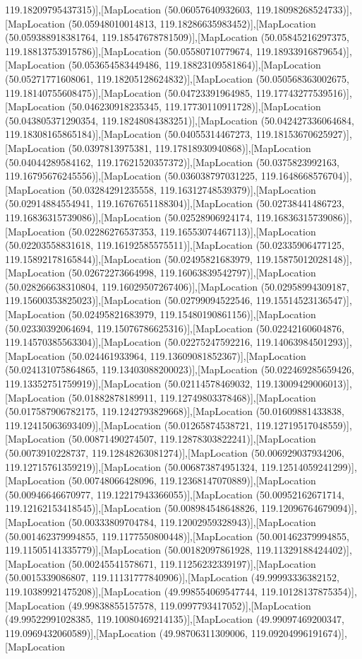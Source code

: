 119.18209795437315)],[MapLocation (50.06057640932603, 119.18098268524733)],[MapLocation (50.05948010014813, 119.18286635983452)],[MapLocation (50.059388918381764, 119.18547678781509)],[MapLocation (50.05845216297375, 119.18813753915786)],[MapLocation (50.05580710779674, 119.18933916879654)],[MapLocation (50.053654583449486, 119.18823109581864)],[MapLocation (50.05271771608061, 119.18205128624832)],[MapLocation (50.050568363002675, 119.18140755608475)],[MapLocation (50.04723391964985, 119.17743277539516)],[MapLocation (50.046230918235345, 119.17730110911728)],[MapLocation (50.043805371290354, 119.18248084383251)],[MapLocation (50.042427336064684, 119.18308165865184)],[MapLocation (50.04055314467273, 119.18153670625927)],[MapLocation (50.0397813975381, 119.17818930940868)],[MapLocation (50.04044289584162, 119.17621520357372)],[MapLocation (50.0375823992163, 119.16795676245556)],[MapLocation (50.036038797031225, 119.1648668576704)],[MapLocation (50.03284291235558, 119.16312748539379)],[MapLocation (50.02914884554941, 119.16767651188304)],[MapLocation (50.02738441486723, 119.16836315739086)],[MapLocation (50.02528906924174, 119.16836315739086)],[MapLocation (50.02286276537353, 119.16553074467113)],[MapLocation (50.02203558831618, 119.16192585575511)],[MapLocation (50.02335906477125, 119.15892178165844)],[MapLocation (50.02495821683979, 119.15875012028148)],[MapLocation (50.02672273664998, 119.16063839542797)],[MapLocation (50.028266638310804, 119.16029507267406)],[MapLocation (50.02958994309187, 119.15600353825023)],[MapLocation (50.02799094522546, 119.15514523136547)],[MapLocation (50.02495821683979, 119.15480190861156)],[MapLocation (50.02330392064694, 119.15076786625316)],[MapLocation (50.02242160604876, 119.14570385563304)],[MapLocation (50.02275247592216, 119.14063984501293)],[MapLocation (50.024461933964, 119.13609081852367)],[MapLocation (50.024131075864865, 119.13403088200023)],[MapLocation (50.022469285659426, 119.13352751759919)],[MapLocation (50.02114578469032, 119.13009429006013)],[MapLocation (50.01882878189911, 119.12749803378468)],[MapLocation (50.017587906782175, 119.1242793829668)],[MapLocation (50.01609881433838, 119.12415063693409)],[MapLocation (50.01265874538721, 119.12719517048559)],[MapLocation (50.00871490274507, 119.12878303822241)],[MapLocation (50.0073910228737, 119.12848263081274)],[MapLocation (50.006929037934206, 119.12715761359219)],[MapLocation (50.006873874951324, 119.12514059241299)],[MapLocation (50.00748066428096, 119.12368147070889)],[MapLocation (50.00946646670977, 119.12217943366055)],[MapLocation (50.00952162671714, 119.12162153418545)],[MapLocation (50.008984548648826, 119.12096764679094)],[MapLocation (50.00333809704784, 119.12002959328943)],[MapLocation (50.001462379994855, 119.1177550800448)],[MapLocation (50.001462379994855, 119.11505141335779)],[MapLocation (50.00182097861928, 119.11329188424402)],[MapLocation (50.00245541578671, 119.11256232339197)],[MapLocation (50.0015339086807, 119.11131777840906)],[MapLocation (49.99993336382152, 119.10389921475208)],[MapLocation (49.998554069547744, 119.10128137875354)],[MapLocation (49.99838855157578, 119.0997793417052)],[MapLocation (49.99522991028385, 119.10080469214135)],[MapLocation (49.99097469200347, 119.0969432060589)],[MapLocation (49.98706311309006, 119.09204996191674)],[MapLocation 